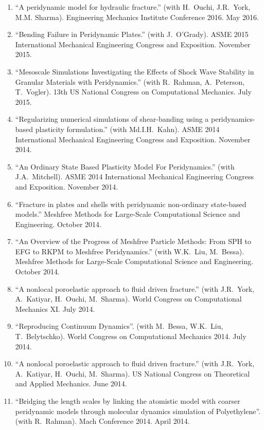 \else
\ifdefined\ispdf
\begin{etaremune}
\else
\begin{enumerate}
\fi
    \item ``A peridynamic model for hydraulic fracture.'' (with H.\ Ouchi, J.R.\ York, M.M. Sharma). Engineering Mechanics Institute Conference 2016. May 2016.
    \item ``Bending Failure in Peridynamic Plates.'' (with J.~O'Grady). ASME 2015 International Mechanical Engineering Congress and Exposition. November 2015.
    \item ``Mesoscale Simulations Investigating the Effects of Shock Wave Stability in Granular Materials with Peridynamics.'' (with R.~Rahman, A.~Peterson, T.~Vogler). 13th US National Congress on Computational Mechanics. July 2015.
    \item ``Regularizing numerical simulations of shear-banding using a peridynamics-based plasticity formulation.'' (with Md.I.H.~Kahn). ASME 2014 International Mechanical Engineering Congress and Exposition. November 2014.
    \item ``An Ordinary State Based Plasticity Model For Peridynamics.'' (with J.A.~Mitchell). ASME 2014 International Mechanical Engineering Congress and Exposition. November 2014.
    \item ``Fracture in plates and shells with peridynamic non-ordinary state-based models.''  Meshfree Methods for Large-Scale Computational Science and Engineering. October 2014.
    \item ``An Overview of the Progress of Meshfree Particle Methods: From SPH to EFG to RKPM to Meshfree Peridynamics.'' (with W.K.~Liu, M.~Bessa). Meshfree Methods for Large-Scale Computational Science and Engineering. October 2014.
    \item ``A nonlocal poroelastic approach to fluid driven fracture.'' (with J.R.~York, A.~Katiyar, H.~Ouchi, M.~Sharma). World Congress on Computational Mechanics XI.  July 2014.
    \item ``Reproducing Continuum Dynamics''. (with M.~Bessa, W.K.~Liu, T.~Belytschko). World Congress on Computational Mechanics 2014.  July 2014.
    \item ``A nonlocal poroelastic approach to fluid driven fracture.'' (with J.R.~York, A.~Katiyar, H.~Ouchi, M.~Sharma). US National Congress on Theoretical and Applied Mechanics.  June 2014.
    \item ``Bridging the length scales by linking the atomistic model with coarser peridynamic models through molecular dynamics simulation of Polyethylene''. (with R.~Rahman). Mach Conference 2014.  April 2014.

\end{enumerate}
\end{etaremune}

